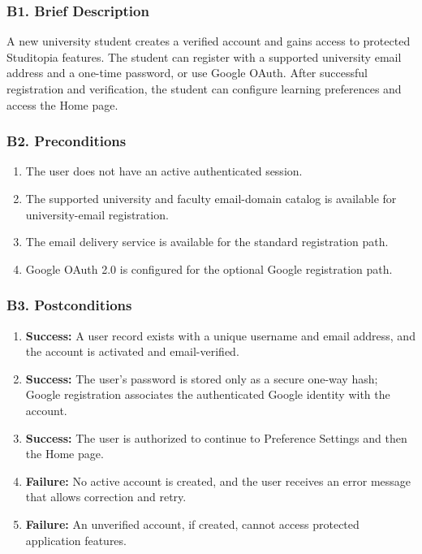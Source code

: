 \documentclass[12pt]{article}
\begin{document}
\hypertarget{sec:b1-brief-description}{}
\subsubsection*{B1. Brief Description}
\par\medskip

A new university student creates a verified account and gains access to protected Studitopia features. The student can register with a supported university email address and a one-time password, or use Google OAuth. After successful registration and verification, the student can configure learning preferences and access the Home page.
\par\medskip

\hypertarget{sec:b2-preconditions}{}
\subsubsection*{B2. Preconditions}
\par\medskip

\begin{enumerate}
\item The user does not have an active authenticated session.
\item The supported university and faculty email-domain catalog is available for university-email registration.
\item The email delivery service is available for the standard registration path.
\item Google OAuth 2.0 is configured for the optional Google registration path.
\end{enumerate}
\par\medskip

\hypertarget{sec:b3-postconditions}{}
\subsubsection*{B3. Postconditions}
\par\medskip

\begin{enumerate}
\item \textbf{Success:} A user record exists with a unique username and email address, and the account is activated and email-verified.
\item \textbf{Success:} The user's password is stored only as a secure one-way hash; Google registration associates the authenticated Google identity with the account.
\item \textbf{Success:} The user is authorized to continue to Preference Settings and then the Home page.
\item \textbf{Failure:} No active account is created, and the user receives an error message that allows correction and retry.
\item \textbf{Failure:} An unverified account, if created, cannot access protected application features.
\end{enumerate}
\par\medskip
\end{document}
